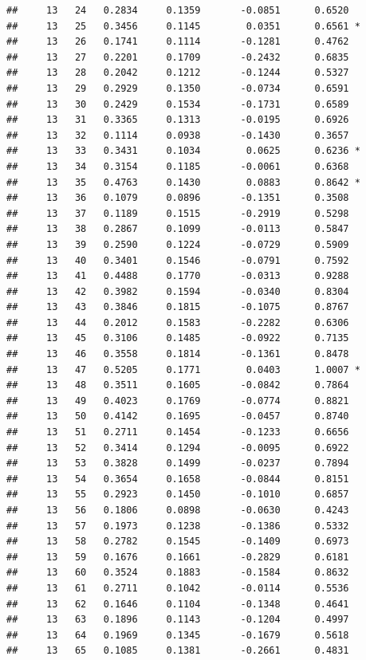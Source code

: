 \documentclass[
]{article}
\begin{document}
\begin{verbatim}
##     13   24   0.2834     0.1359       -0.0851      0.6520  
##     13   25   0.3456     0.1145        0.0351      0.6561 *
##     13   26   0.1741     0.1114       -0.1281      0.4762  
##     13   27   0.2201     0.1709       -0.2432      0.6835  
##     13   28   0.2042     0.1212       -0.1244      0.5327  
##     13   29   0.2929     0.1350       -0.0734      0.6591  
##     13   30   0.2429     0.1534       -0.1731      0.6589  
##     13   31   0.3365     0.1313       -0.0195      0.6926  
##     13   32   0.1114     0.0938       -0.1430      0.3657  
##     13   33   0.3431     0.1034        0.0625      0.6236 *
##     13   34   0.3154     0.1185       -0.0061      0.6368  
##     13   35   0.4763     0.1430        0.0883      0.8642 *
##     13   36   0.1079     0.0896       -0.1351      0.3508  
##     13   37   0.1189     0.1515       -0.2919      0.5298  
##     13   38   0.2867     0.1099       -0.0113      0.5847  
##     13   39   0.2590     0.1224       -0.0729      0.5909  
##     13   40   0.3401     0.1546       -0.0791      0.7592  
##     13   41   0.4488     0.1770       -0.0313      0.9288  
##     13   42   0.3982     0.1594       -0.0340      0.8304  
##     13   43   0.3846     0.1815       -0.1075      0.8767  
##     13   44   0.2012     0.1583       -0.2282      0.6306  
##     13   45   0.3106     0.1485       -0.0922      0.7135  
##     13   46   0.3558     0.1814       -0.1361      0.8478  
##     13   47   0.5205     0.1771        0.0403      1.0007 *
##     13   48   0.3511     0.1605       -0.0842      0.7864  
##     13   49   0.4023     0.1769       -0.0774      0.8821  
##     13   50   0.4142     0.1695       -0.0457      0.8740  
##     13   51   0.2711     0.1454       -0.1233      0.6656  
##     13   52   0.3414     0.1294       -0.0095      0.6922  
##     13   53   0.3828     0.1499       -0.0237      0.7894  
##     13   54   0.3654     0.1658       -0.0844      0.8151  
##     13   55   0.2923     0.1450       -0.1010      0.6857  
##     13   56   0.1806     0.0898       -0.0630      0.4243  
##     13   57   0.1973     0.1238       -0.1386      0.5332  
##     13   58   0.2782     0.1545       -0.1409      0.6973  
##     13   59   0.1676     0.1661       -0.2829      0.6181  
##     13   60   0.3524     0.1883       -0.1584      0.8632  
##     13   61   0.2711     0.1042       -0.0114      0.5536  
##     13   62   0.1646     0.1104       -0.1348      0.4641  
##     13   63   0.1896     0.1143       -0.1204      0.4997  
##     13   64   0.1969     0.1345       -0.1679      0.5618  
##     13   65   0.1085     0.1381       -0.2661      0.4831  

\end{verbatim}
\end{document}
